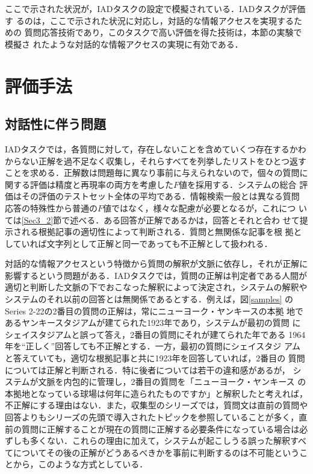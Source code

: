 \documentclass[japanese]{jnlp_1.4}
\begin{document}
ここで示された状況が，IADタスクの設定で模擬されている．IADタスクが評価す
るのは，ここで示された状況に対応し，対話的な情報アクセスを実現するための
質問応答技術であり，このタスクで高い評価を得た技術は，本節の実験で模擬さ
れたような対話的な情報アクセスの実現に有効である．



\section{評価手法} \label{Sec3}

\subsection{対話性に伴う問題}

IADタスクでは，各質問に対して，存在しないことを含めていくつ存在するかわ
からない正解を過不足なく収集し，それらすべてを列挙したリストをひとつ返す
ことを求める．正解数は問題毎に異なり事前に与えられないので，個々の質問に
関する評価は精度と再現率の両方を考慮した$F$値を採用する．システムの総合
評価はその評価のテストセット全体の平均である．情報検索一般とは異なる質問
応答の特殊性から普通の$F$値ではなく，様々な配慮が必要となるが，これにつ
いては\ref{Sec3_2}節で述べる．ある回答が正解であるかは，回答とそれと合わ
せて提示される根拠記事の適切性によって判断される．質問と無関係な記事を根
拠としていれば文字列として正解と同一であっても不正解として扱われる．

対話的な情報アクセスという特徴から質問の解釈が文脈に依存し，それが正解に
影響するという問題がある．IADタスクでは，質問の正解は判定者である人間が
適切と判断した文脈の下でおこなった解釈によって決定され，システムの解釈や
システムのそれ以前の回答とは無関係であるとする．例えば，図\ref{samples} 
のSeries 2-22の2番目の質問の正解は，常にニューヨーク・ヤンキースの本拠
地であるヤンキースタジアムが建てられた1923年であり，システムが最初の質問
にシェイスタジアムと誤って答え，2番目の質問にそれが建てられた年である
1964年を``正しく''回答しても不正解とする．一方，最初の質問にシェイスタジ
アムと答えていても，適切な根拠記事と共に1923年を回答していれば，2番目の
質問については正解と判断される．特に後者については若干の違和感があるが，
システムが文脈を内包的に管理し，2番目の質問を「ニューヨーク・ヤンキース
の本拠地となっている球場は何年に造られたものですか」と解釈したと考えれば，
不正解にする理由はない．また，収集型のシリーズでは，質問文は直前の質問や
回答よりもシリーズの先頭で導入されたトピックを参照していることが多く，直
前の質問に正解することが現在の質問に正解する必要条件になっている場合は必
ずしも多くない．これらの理由に加えて，システムが起こしうる誤った解釈すべ
てについてその後の正解がどうあるべきかを事前に判断するのは不可能というこ
とから，このような方式としている．
\end{document}
